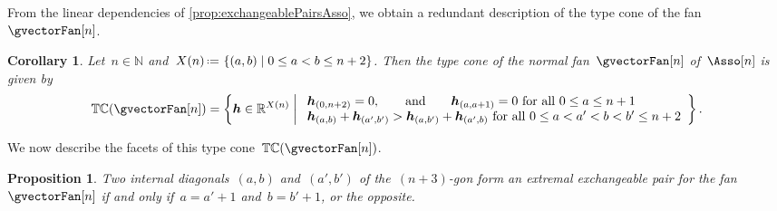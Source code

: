 \documentclass{amsart}
\newtheorem{corollary}[theorem]{Corollary}
\newtheorem{proposition}[theorem]{Proposition}
\theoremstyle{definition}
\newcommand{\R}{\mathbb{R}} %
\newcommand{\N}{\mathbb{N}} %
\renewcommand{\b}[1]{{\boldsymbol{#1}}} %
\newcommand{\set}[2]{\left\{ #1 \;\middle|\; #2 \right\}} %
\newcommand{\eqdef}{\mbox{\,\raisebox{0.2ex}{\scriptsize\ensuremath{\mathrm:}}\ensuremath{=}\,}} %
\newcommand{\typeCone}{\mathbb{TC}} %
\begin{document}
From the linear dependencies of \cref{prop:exchangeablePairsAsso}, we obtain a redundant description of the type cone of the fan~$\gvectorFan[n]$.

\begin{corollary}
\label{coro:typeConeAsso}
Let~$n \in \N$ and~$X(n) \eqdef \set{(a,b)}{0 \le a < b \le n+2}$. Then the type cone of the normal fan~$\gvectorFan[n]$ of~$\Asso[n]$ is given by
\[
\typeCone(\gvectorFan[n]) = \set{\b{h} \in \R^{X(n)}}{\begin{array}{l} \b{h}_{(0,n+2)} = 0, \qquad\text{and}\qquad \b{h}_{(a,a+1)} = 0 \text{ for all } 0 \le a \le n+1 \\ \b{h}_{(a,b)} + \b{h}_{(a',b')} > \b{h}_{(a,b')} + \b{h}_{(a',b)} \text{ for all } 0 \le a < a' < b < b' \le n+2 \end{array}}.
\]
\end{corollary}

We now describe the facets of this type cone~$\typeCone(\gvectorFan[n])$.

\begin{proposition}
\label{prop:extremalExchangeablePairsAsso}
Two internal diagonals~$(a,b)$ and~$(a',b')$ of the~$(n+3)$-gon form an extremal exchangeable pair for the fan~$\gvectorFan[n]$ if and only if~$a = a'+1$ and~$b = b'+1$, or the opposite.
\end{proposition}
\end{document}

